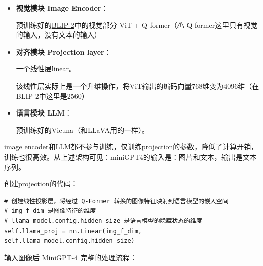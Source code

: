 \documentclass[zihao=false,fontset=windows]{ctexart}
\newcommand{\feiEmoji}[1]{{\emojifont #1}}
\begin{document}
\begin{itemize}
\item \colorbox{feishuPinkBg}{\textbf{视觉模块 Image Encoder}}：\par
预训练好的\href{https://scnajei2ds6y.feishu.cn/wiki/AZiVwFmXEirI77kAVzYcOMNVnbh#NAZtdozkGoFqMQxHJgKc9rCynbe}{BLIP-2}中的视觉部分 ViT + Q-former（\feiEmoji{⚠} \textcolor{feishuGreen}{Q-former这里只有视觉的输入，没有文本的输入}）\par

\item \colorbox{feishuPinkBg}{\textbf{对齐模块 Projection layer}}：\par
一个线性层linear。\par

该线性层实际上是一个升维操作，将ViT输出的编码向量768维变为4096维（在BLIP-2中这里是2560）\par

\item \colorbox{feishuPinkBg}{\textbf{语言模块 LLM}}：\par
预训练好的Vicuna（和LLaVA用的一样）。\par

\end{itemize}

image encoder和LLM都不参与训练，仅训练projection的参数，降低了计算开销，训练也很高效。从上述架构可见：miniGPT4的输入是：图片和文本，输出是文本序列。\par

创建projection的代码：\par

\begin{feishucode}
\begin{lstlisting}
# 创建线性投影层，将经过 Q-Former 转换的图像特征映射到语言模型的嵌入空间
# img_f_dim 是图像特征的维度
# llama_model.config.hidden_size 是语言模型的隐藏状态的维度
self.llama_proj = nn.Linear(img_f_dim, self.llama_model.config.hidden_size)
\end{lstlisting}
\end{feishucode}

输入图像后 MiniGPT-4 完整的处理流程：\par
\end{document}
